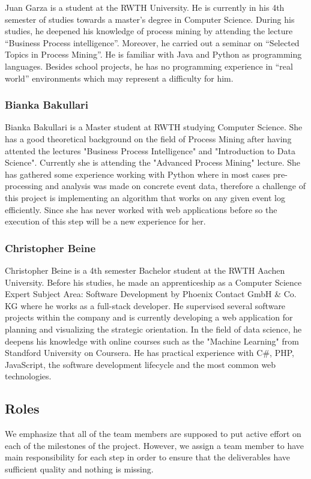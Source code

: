 \documentclass[notitlepage]{article}
\begin{document}
\begin{flushleft}
Juan Garza is a student at the RWTH University. He is currently in his 4th semester of studies towards a master’s degree in Computer Science. During his studies, he deepened his knowledge of process mining by attending the lecture “Business Process intelligence”. Moreover, he carried out a seminar on “Selected Topics in Process Mining”. He is familiar with Java and Python as programming languages. Besides school projects, he has no programming experience in “real world” environments which may represent a difficulty for him. 

\subsubsection*{Bianka Bakullari}

Bianka Bakullari is a Master student at RWTH studying Computer Science.
She has a good theoretical background on the field of Process Mining after having attented the lectures "Business Process Intelligence" and "Introduction to Data Science". 
Currently she is attending the "Advanced Process Mining" lecture.
She has gathered some experience working with Python where in most cases pre-processing and analysis was made on concrete event data, therefore a challenge of this project is implementing an algorithm that works on any given event log efficiently.
Since she has never worked with web applications before so the execution of this step will be a new experience for her.


\subsubsection*{Christopher Beine}
Christopher Beine is a 4th semester Bachelor student at the RWTH Aachen University. Before his studies, he made an apprenticeship as a Computer Science Expert Subject Area: Software Development 
by Phoenix Contact GmbH \& Co. KG where he works as a full-stack developer. He supervised several software projects within the company and is currently 
developing a web application for planning and visualizing the strategic orientation. In the field of data science, he deepens his knowledge with online courses such as the "Machine Learning" from Standford University on Coursera. 
He has practical experience with C\#, PHP, JavaScript, the software development lifecycle and the most common web technologies.    


\subsection{Roles}
We emphasize that all of the team members are supposed to put active effort on each of the milestones of the project.
However, we assign a team member to have main responsibility for each step in order to ensure that the deliverables have sufficient quality and nothing is missing.


\end{flushleft}
\end{document}
